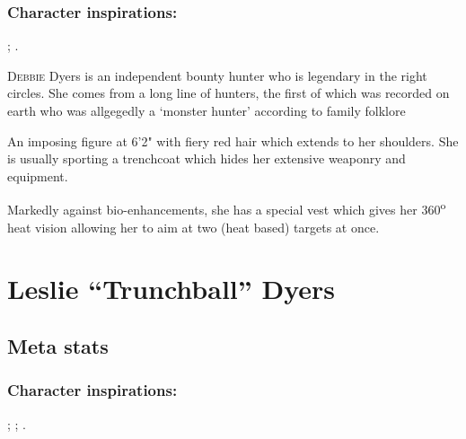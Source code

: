 \documentclass[a4paper,onepage]{memoir}
\begin{document}
\subsubsection{Character inspirations:} ;
.

\begin{npcdescription}
  \lettrine{D}{ebbie} Dyers is an independent bounty hunter who is legendary in
  the right circles. She comes from a long line of hunters, the first of which
  was recorded on earth who was allgegedly a `monster hunter' according to
  family folklore

  An imposing figure at 6'2" with fiery red hair which extends to her shoulders.
  She is usually sporting a trenchcoat which hides her extensive weaponry and
  equipment.

  Markedly against bio-enhancements, she has a special vest which gives her
  360\textsuperscript{o} heat vision allowing her to aim at two (heat based)
  targets at once.
\end{npcdescription}


\section{Leslie ``Trunchball'' Dyers}
\label{sec:lesl-trunchb-dyers}

\begin{character*}
     

\end{character*}


\subsection{Meta stats}
\subsubsection{Character inspirations:} ;
; .
\end{document}
